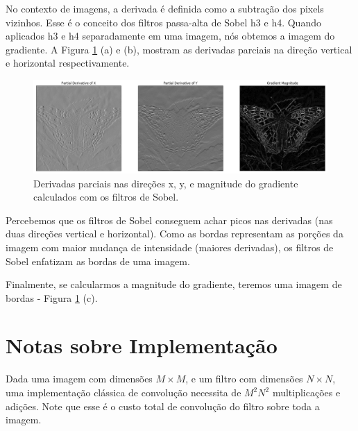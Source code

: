 \documentclass[10pt,twocolumn,letterpaper]{article}
\begin{document}
No contexto de imagens, a derivada é definida como a subtração dos pixels vizinhos. Esse é o conceito dos filtros passa-alta de Sobel h3 e h4. Quando aplicados h3 e h4 separadamente em uma imagem, nós obtemos a imagem do gradiente. A Figura \ref{fig:sobel} (a) e (b), mostram as derivadas parciais na direção vertical e horizontal respectivamente.

\begin{figure}[h!]
\begin{center}
	\includegraphics[height=0.67\columnwidth]{pics/sobel}
	\caption{Derivadas parciais nas direções x, y, e magnitude do gradiente calculados com os filtros de Sobel.\label{fig:sobel}}   
\end{center} 
\end{figure}  

Percebemos que os filtros de Sobel conseguem achar picos nas derivadas (nas duas direções vertical e horizontal). Como as bordas representam as porções da imagem com maior mudança de intensidade (maiores derivadas), os filtros de Sobel enfatizam as bordas de uma imagem.

Finalmente, se calcularmos a magnitude do gradiente, teremos uma imagem de bordas - Figura \ref{fig:sobel} (c).

\section{Notas sobre Implementação}

Dada uma imagem com dimensões $M \times M$, e um filtro com dimensões $N \times N$, uma implementação clássica de convolução necessita de $M^2N^2$ multiplicações e adições. Note que esse é o custo total de convolução do filtro sobre toda a imagem.
\end{document}
